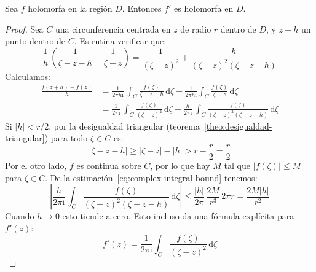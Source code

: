  \begin{theorem}
    \label{theo:Cauchy-formula-f-prime}
    Sea \(f\) holomorfa en la región \(D\).
    Entonces \(f'\) es holomorfa en \(D\).
  \end{theorem}
  \begin{proof}
    Sea \(C\) una circunferencia centrada en \(z\) de radio \(r\)
    dentro de \(D\),
    y \(z + h\) un punto dentro de \(C\).
    Es rutina verificar que:
    \begin{equation*}
      \frac{1}{h} \,
	\left(
	  \frac{1}{\zeta - z - h} - \frac{1}{\zeta - z}
	\right)
	= \frac{1}{(\zeta - z)^2}
	    + \frac{h}{(\zeta - z)^2 (\zeta - z - h)}
    \end{equation*}
    Calculamos:
    \begin{align*}
      \frac{f(z + h) - f(z)}{h}
	&= \frac{1}{2 \pi h \mathrm{i}} \,
	     \int_C \frac{f(\zeta)}{\zeta - z - h}
		 \, \mathrm{d} \zeta
	     - \frac{1}{2 \pi h \mathrm{i}}
		 \int_C \frac{f(\zeta)}{\zeta - z}
		    \, \mathrm{d} \zeta \\
	&= \frac{1}{2 \pi \mathrm{i}} \,
	     \int_C \frac{f(\zeta)}{(\zeta - z)^2}
		 \, \mathrm{d} \zeta
	       + \frac{h}{2 \pi \mathrm{i}} \,
		   \int_C \frac{f(\zeta)}
			       {(\zeta - z)^2 (\zeta - z - h)}
		     \, \mathrm{d} \zeta
    \end{align*}
    Si \(\lvert h \rvert < r / 2\),
    por la desigualdad triangular
    (teorema~\ref{theo:desigualdad-triangular})%
    para todo \(\zeta \in C\) es:
    \begin{equation*}
      \lvert \zeta - z - h \rvert
	\ge \lvert \zeta - z \rvert - \lvert h \rvert
	> r - \frac{r}{2}
	= \frac{r}{2}
    \end{equation*}
    Por el otro lado,
    \(f\) es continua sobre \(C\),
    por lo que hay \(M\) tal que \(\lvert f(\zeta) \rvert \le M\)
    para \(\zeta \in C\).
    De la estimación~\eqref{eq:complex-integral-bound} tenemos:
    \begin{equation*}
      \left\lvert
	\frac{h}{2 \pi \mathrm{i}} \,
	  \int_C \frac{f(\zeta)}{(\zeta - z)^2 (\zeta - z - h)}
		   \, \mathrm{d} \zeta
      \right\rvert
	\le \frac{\lvert h \rvert}{2 \pi}
	       \, \frac{2 M}{r^3} \, 2 \pi r
	= \frac{2 M \lvert h \rvert}{r^2}
    \end{equation*}
    Cuando \(h \rightarrow 0\) esto tiende a cero.
    Esto incluso da una fórmula explícita para \(f'(z)\):
    \begin{equation*}
      f'(z)
	= \frac{1}{2 \pi \mathrm{i}}
	    \int_C \frac{f(\zeta)}{(\zeta - z)^2}
	       \, \mathrm{d} \zeta
    \end{equation*}
  \end{proof}

